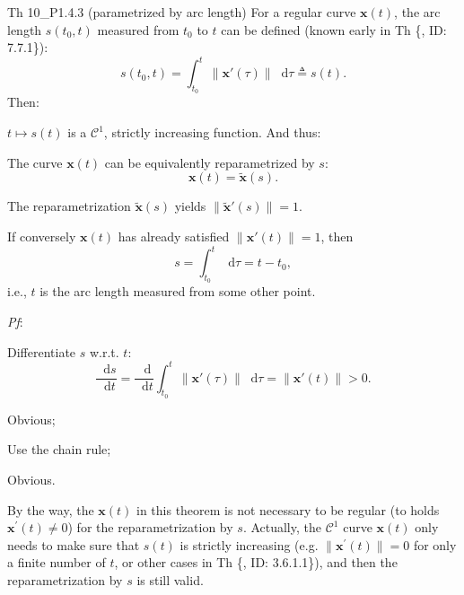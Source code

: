 \documentclass{article}
\newcommand{\dif}{\mathop{}\!\mathrm{d}}
\begin{document}
\begin{Th}{Th 10\_P1.4.3 (parametrized by arc length)}
    \textcolor{Th}{For a regular curve $\pmb{x}(t)$, the arc length $s(t_0, t)$ measured from $t_0$ to $t$ can be defined (known early in Th \{, ID: 7.7.1\}):
    $$ s(t_0, t) = \int_{t_0}^t \|\pmb{x}'(\tau)\|\dif \tau \triangleq s(t). $$}
    Then:
    \begin{compactenum}
        \item $t\mapsto s(t)$ is a $\mathcal{C}^1$, strictly increasing function. And thus:
        \item The curve $\pmb{x}(t)$ can be equivalently reparametrized by $s$:
        $$ \pmb{x}(t) = \tilde{\pmb{x}}(s). $$
        \item The reparametrization $\tilde{\pmb{x}}(s)$ yields $\|\tilde{\pmb{x}}'(s)\| = 1$.
        \item If conversely $\pmb{x}(t)$ has already satisfied $\|\pmb{x}'(t)\| = 1$, then
        $$ s = \int_{t_0}^t \dif \tau = t - t_0, $$
        i.e., $t$ is the arc length measured from some other point.
    \end{compactenum}
    \tcblower
    \textit{Pf}: 
    \begin{compactenum}
        \item Differentiate $s$ w.r.t. $t$:
        $$ \frac{\dif s}{\dif t} = \frac{\dif}{\dif t} \int_{t_0}^t \|\pmb{x}'(\tau)\|\dif \tau = \|\pmb{x}'(t)\| > 0. $$
        \item Obvious;
        \item Use the chain rule;
        \item Obvious.
    \end{compactenum}
\end{Th}

\textcolor{Th}{By the way, the $\pmb{x}(t)$ in this theorem is not necessary to be regular (to holds $\pmb{x}^\prime (t) \neq 0$) for the reparametrization by $s$. Actually, the $\mathcal{C}^1$ curve $\pmb{x}(t)$ only needs to make sure that $s(t)$ is strictly increasing (e.g. $\|\pmb{x}^\prime (t)\| = 0$ for only a finite number of $t$, or other cases in Th \{, ID: 3.6.1.1\}), and then the reparametrization by $s$ is still valid.}
\end{document}
